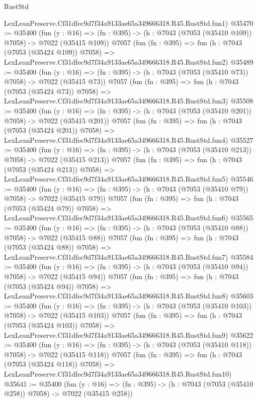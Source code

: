 \begin{lexlean}{RustStd}
\begin{coremodule}
    LexLeanPreserve.Cf31dfec9d7f34a9133ae65a349666318.R45.RustStd.fun1)
@35470 := @35400
    (fun (y : @16) => (fn : @395) -> (h : @7043 (@7053 (@35410 @109)) @7058) -> @7022 (@35415 @109))
    @7057
    (fun (fn : @395) =>
    fun (h : @7043 (@7053 (@35424 @109)) @7058) =>
    LexLeanPreserve.Cf31dfec9d7f34a9133ae65a349666318.R45.RustStd.fun2)
@35489 := @35400
    (fun (y : @16) => (fn : @395) -> (h : @7043 (@7053 (@35410 @73)) @7058) -> @7022 (@35415 @73))
    @7057
    (fun (fn : @395) =>
    fun (h : @7043 (@7053 (@35424 @73)) @7058) =>
    LexLeanPreserve.Cf31dfec9d7f34a9133ae65a349666318.R45.RustStd.fun3)
@35508 := @35400
    (fun (y : @16) => (fn : @395) -> (h : @7043 (@7053 (@35410 @201)) @7058) -> @7022 (@35415 @201))
    @7057
    (fun (fn : @395) =>
    fun (h : @7043 (@7053 (@35424 @201)) @7058) =>
    LexLeanPreserve.Cf31dfec9d7f34a9133ae65a349666318.R45.RustStd.fun4)
@35527 := @35400
    (fun (y : @16) => (fn : @395) -> (h : @7043 (@7053 (@35410 @213)) @7058) -> @7022 (@35415 @213))
    @7057
    (fun (fn : @395) =>
    fun (h : @7043 (@7053 (@35424 @213)) @7058) =>
    LexLeanPreserve.Cf31dfec9d7f34a9133ae65a349666318.R45.RustStd.fun5)
@35546 := @35400
    (fun (y : @16) => (fn : @395) -> (h : @7043 (@7053 (@35410 @79)) @7058) -> @7022 (@35415 @79))
    @7057
    (fun (fn : @395) =>
    fun (h : @7043 (@7053 (@35424 @79)) @7058) =>
    LexLeanPreserve.Cf31dfec9d7f34a9133ae65a349666318.R45.RustStd.fun6)
@35565 := @35400
    (fun (y : @16) => (fn : @395) -> (h : @7043 (@7053 (@35410 @88)) @7058) -> @7022 (@35415 @88))
    @7057
    (fun (fn : @395) =>
    fun (h : @7043 (@7053 (@35424 @88)) @7058) =>
    LexLeanPreserve.Cf31dfec9d7f34a9133ae65a349666318.R45.RustStd.fun7)
@35584 := @35400
    (fun (y : @16) => (fn : @395) -> (h : @7043 (@7053 (@35410 @94)) @7058) -> @7022 (@35415 @94))
    @7057
    (fun (fn : @395) =>
    fun (h : @7043 (@7053 (@35424 @94)) @7058) =>
    LexLeanPreserve.Cf31dfec9d7f34a9133ae65a349666318.R45.RustStd.fun8)
@35603 := @35400
    (fun (y : @16) => (fn : @395) -> (h : @7043 (@7053 (@35410 @103)) @7058) -> @7022 (@35415 @103))
    @7057
    (fun (fn : @395) =>
    fun (h : @7043 (@7053 (@35424 @103)) @7058) =>
    LexLeanPreserve.Cf31dfec9d7f34a9133ae65a349666318.R45.RustStd.fun9)
@35622 := @35400
    (fun (y : @16) => (fn : @395) -> (h : @7043 (@7053 (@35410 @118)) @7058) -> @7022 (@35415 @118))
    @7057
    (fun (fn : @395) =>
    fun (h : @7043 (@7053 (@35424 @118)) @7058) =>
    LexLeanPreserve.Cf31dfec9d7f34a9133ae65a349666318.R45.RustStd.fun10)
@35641 := @35400
    (fun (y : @16) => (fn : @395) -> (h : @7043 (@7053 (@35410 @258)) @7058) -> @7022 (@35415 @258))

\end{coremodule}
\end{lexlean}
